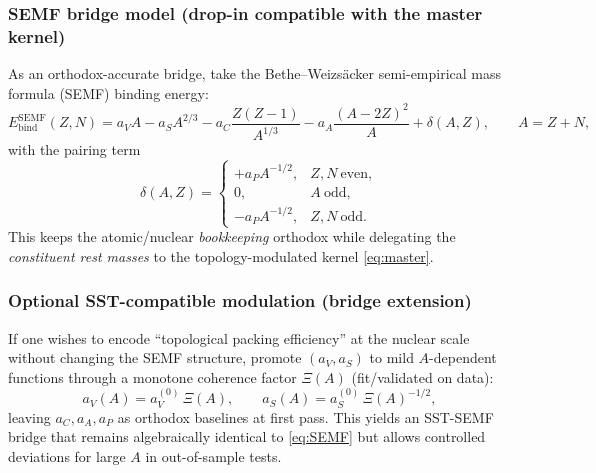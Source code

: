 \documentclass[11pt]{article}
\theoremstyle{definition}
\theoremstyle{plain}
\theoremstyle{remark}
\begin{document}
            \subsubsection{SEMF bridge model (drop-in compatible with the master kernel)}

                As an orthodox-accurate bridge, take the Bethe--Weizs\"acker semi-empirical mass formula (SEMF) binding energy:
                \begin{equation}
                    E_{\mathrm{bind}}^{\mathrm{SEMF}}(Z,N)
                    =
                    a_V A
                    - a_S A^{2/3}
                    - a_C \frac{Z(Z-1)}{A^{1/3}}
                    - a_A \frac{(A-2Z)^2}{A}
                    + \delta(A,Z),
                    \qquad A=Z+N,
                    \label{eq:SEMF}
                \end{equation}
                with the pairing term
                \begin{equation}
                    \delta(A,Z)=
                    \begin{cases}
                        +a_P A^{-1/2}, & Z,N\ \text{even},\\
                        0, & A\ \text{odd},\\
                        -a_P A^{-1/2}, & Z,N\ \text{odd}.
                    \end{cases}
                    \label{eq:pairing}
                \end{equation}
                This keeps the atomic/nuclear \emph{bookkeeping} orthodox while delegating the \emph{constituent rest masses} to the topology-modulated kernel \eqref{eq:master}.
                \cite{Weizsaecker1935,BetheBacher1936}

            \subsubsection{Optional SST-compatible modulation (bridge extension)}
                If one wishes to encode ``topological packing efficiency'' at the nuclear scale without changing the SEMF structure, promote \((a_V,a_S)\) to mild \(A\)-dependent functions through a monotone coherence factor \(\Xi(A)\) (fit/validated on data):
                \begin{equation}
                    a_V(A)=a_V^{(0)}\,\Xi(A),
                    \qquad
                    a_S(A)=a_S^{(0)}\,\Xi(A)^{-1/2},
                    \label{eq:XiBridge}
                \end{equation}
                leaving \(a_C,a_A,a_P\) as orthodox baselines at first pass. This yields an SST-SEMF bridge that remains algebraically identical to \eqref{eq:SEMF} but allows controlled deviations for large \(A\) in out-of-sample tests.
\end{document}
